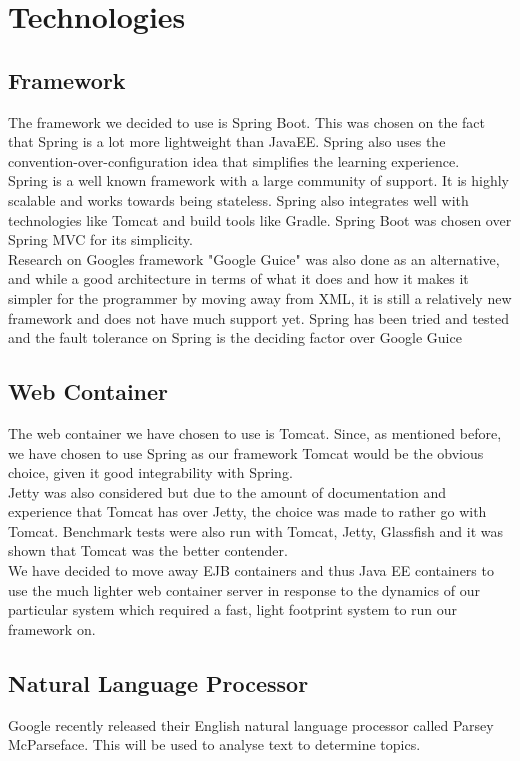 \documentclass[hidelinks,english]{article}
\begin{document}
	\section{Technologies}
		\subsection{Framework}
			The framework we decided to use is Spring Boot. This was chosen on the fact that Spring is a lot more lightweight than JavaEE. Spring also uses the convention-over-configuration idea that simplifies the learning experience.\\
			Spring is a well known framework with a large community of support. It is highly scalable and works towards being stateless. Spring also integrates well with technologies like Tomcat and build tools like Gradle. Spring Boot was chosen over Spring MVC for its simplicity.\\
			
			Research on Googles framework "Google Guice" was also done as an alternative, and while a good architecture in terms of what it does and how it makes it simpler for the programmer by moving away from XML, it is still a relatively new framework and does not have much support yet. Spring has been tried and tested and the fault tolerance on Spring is the deciding factor over Google Guice
			
		\subsection{Web Container}
			The web container we have chosen to use is Tomcat. Since, as mentioned before, we have chosen to use Spring as our framework Tomcat would be the obvious choice, given it good integrability with Spring.\\
			Jetty was also considered but due to the amount of documentation and experience that Tomcat has over Jetty, the choice was made to rather go with Tomcat. Benchmark tests were also run with Tomcat, Jetty, Glassfish and it was shown that Tomcat was the better contender.\\
			We have decided to move away EJB containers and thus Java EE containers to use the much lighter web container server in response to the dynamics of our particular system which required a fast, light footprint system to run our framework on.
		
		\subsection{Natural Language Processor}
			Google recently released their English natural language processor called Parsey McParseface. This will be used to analyse text to determine topics.
			
\end{document}
